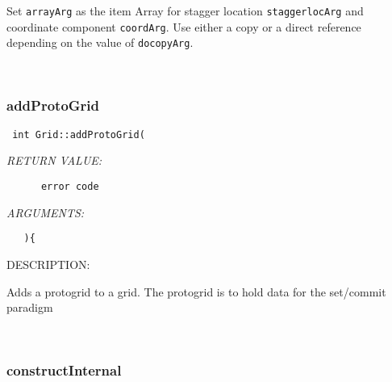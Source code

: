       Set {\tt arrayArg} as the item Array for stagger location 
   {\tt staggerlocArg} and coordinate component {\tt coordArg}. Use either
   a copy or a direct reference depending on the value of {\tt docopyArg}. 
 
\mbox{}\hrulefill\
 
\subsubsection [addProtoGrid] {addProtoGrid}


  
\begin{verbatim} int Grid::addProtoGrid(\end{verbatim}{\em RETURN VALUE:}
\begin{verbatim}      error code\end{verbatim}{\em ARGUMENTS:}
\begin{verbatim}   ){\end{verbatim}
{\sf DESCRIPTION:\\ }


     Adds a protogrid to a grid. The protogrid is to hold data for the 
   set/commit paradigm
   
 
\mbox{}\hrulefill\
 
\subsubsection [constructInternal] {constructInternal}


